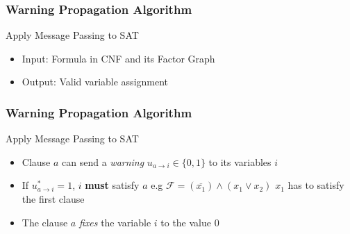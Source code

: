 
\begin{frame}
	\frametitle{Warning Propagation Algorithm}
	Apply Message Passing to SAT
	\begin{itemize}
	\item Input: Formula in CNF and its Factor Graph
	\item Output: Valid variable assignment \newline
	      
	\end{itemize}
\end{frame}

\begin{frame}
	\frametitle{Warning Propagation Algorithm}
	Apply Message Passing to SAT
	\begin{itemize}
		\item Clause $a$ can send a \emph{warning} $u_{a\rightarrow i} \in \{0, 1\}$ to its variables $i$
		\item If $u^\ast_{a \rightarrow i} = 1$, $i$ \textbf{must} satisfy $a$ \newline e.g $\mathcal{F} = (\overline{x_1}) \land (x_1 \lor x_2)$ \newline$x_1$ has to satisfy the first clause
	
\begin{figure}[h]
\centering

\end{figure}
\item The clause $a$ \emph{fixes} the variable $i$ to the value $0$
\end{itemize}
\end{frame}

